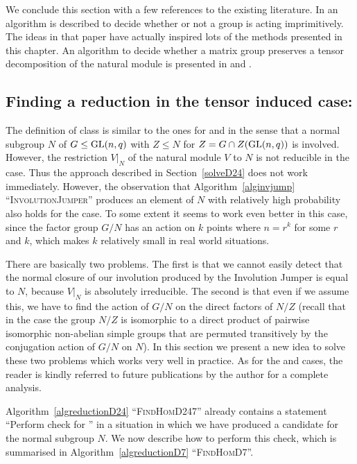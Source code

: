 \smallskip
We conclude this section with a few references to the existing
literature. In \cite{smashnormal} an algorithm is described to decide
whether or not a group is acting imprimitively. The ideas in that
paper have actually inspired lots of the methods presented in this
chapter. An algorithm to decide whether a matrix group preserves a
tensor decomposition of the natural module is presented in
\cite{tensprodproj} and \cite{LGO97}.


\subsection{Finding a reduction in the tensor induced case: }
\label{solveD7}

The definition of class  is similar to the ones for  and  in
the sense that a normal subgroup $N$ of $G \le \GL(n,q)$ with $Z \le N$
for $Z = G \cap Z(\GL(n,q))$ is involved.
However, the restriction $V|_N$ of the natural module $V$ to $N$ is not
reducible in the  case. Thus the approach described in
Section~\ref{solveD24} does not work immediately. However, the observation
that Algorithm~\ref{alginvjump} ``\textsc{InvolutionJumper}'' produces an
element of $N$ with relatively high probability also holds for the 
case. To some extent it seems to work even better in this case, since the 
factor group $G/N$ has an action on $k$ points where $n=r^k$ for some $r$
and $k$, which makes $k$ relatively small in real world situations.

There are basically two problems. The first is that we cannot easily detect 
that the normal closure of our involution produced by the Involution
Jumper is equal to $N$, because $V|_N$ is absolutely irreducible. The
second is that even if we assume this, we have to find the action of $G/N$ on
the direct factors of $N/Z$ (recall that in the  case the group $N/Z$
is isomorphic to a direct product of pairwise isomorphic non-abelian simple
groups that are permuted transitively by the conjugation action of $G/N$ on
$N$). In this section we present a new idea to solve these two problems
which works very well in practice. As for the  and  cases, the reader is
kindly referred to future publications by the author for a complete analysis.

Algorithm~\ref{algreductionD24} ``\textsc{FindHomD247}'' already contains a 
statement ``Perform check for '' in a situation in which we have produced
a candidate for the normal subgroup $N$. We now describe how to perform
this check, which is summarised in Algorithm~\ref{algreductionD7}
``\textsc{FindHomD7}''.


